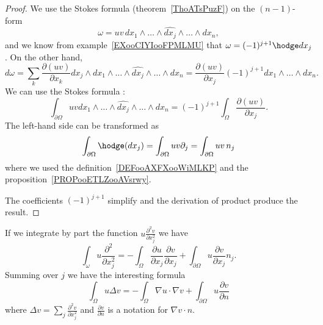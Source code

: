 \begin{proof}
    We use the Stokes formula (theorem~\ref{ThoATsPuzF}) on the \( (n-1)\)-form
    \begin{equation}
        \omega=uv\,dx_1\wedge\ldots\wedge\widehat{dx_j}\wedge\ldots\wedge dx_n,
    \end{equation}
    and we know from example~\ref{EXooCIYIooFPMLMU} that \( \omega=(-1)^{j+1}\hodge dx_j\). On the other hand,
    \begin{equation}
        d\omega=\sum_k\frac{ \partial (uv) }{ \partial x_k }dx_j\wedge dx_1\wedge\ldots\wedge\widehat{dx_j}\wedge\ldots\wedge dx_n=\frac{ \partial (uv) }{ \partial x_j }(-1)^{j+1}dx_1\wedge\ldots\wedge dx_n.
    \end{equation}
    We can use the Stokes formula :
    \begin{equation}
        \int_{\partial \Omega} uv dx_1\wedge\ldots\wedge\widehat{dx_j}\wedge\ldots\wedge dx_n=  (-1)^{j+1} \int_{\Omega}\frac{ \partial (uv) }{ \partial x_j }.
    \end{equation}
    The left-hand side can be transformed as
    \begin{equation}
        \int_{\partial\Omega}\hodge(dx_j)=\int_{\partial\Omega}uv\partial_j=\int_{\partial\Omega}uv\,n_j
    \end{equation}
    where we used the definition~\ref{DEFooAXFXooWiMLKP} and the proposition~\ref{PROPooETLZooAVsrwy}.

    The coefficients \( (-1)^{j+1}\) simplify and the derivation of product produce the result.
\end{proof}

\begin{example}     \label{EXooWLUVooNamnKG}
    If we integrate by part the function \( u\frac{ \partial^2 v }{ \partial x_j^2 }\) we have
    \begin{equation}
        \int_{\omega}u\frac{ \partial^2 }{ \partial x_j^2 }=-\int_{\Omega}\frac{ \partial u }{ \partial x_j }\frac{ \partial v }{ \partial x_j }+\int_{\partial \Omega}u\frac{ \partial v }{ \partial x_j }n_j.
    \end{equation}
    Summing over \( j\) we have the interesting formula
    \begin{equation}        \label{EQooJLDTooIMtxEX}
        \int_{\Omega}u\Delta v=-\int_{\Omega}\nabla u\cdot\nabla v+\int_{\partial \Omega}u\frac{ \partial v }{ \partial n }
    \end{equation}
    where \( \Delta v=\sum_j\frac{ \partial^2v }{ \partial x_j^2 }\) and \( \frac{ \partial v }{ \partial n }\) is a notation for \( \nabla v\cdot n\).
\end{example}

